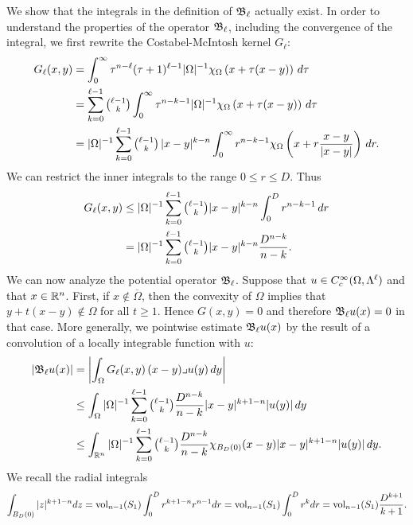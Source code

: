 \documentclass[a4paper]{article}
\begin{document}
We show that the integrals in the definition of ${\mathfrak B}_{\ell}$ actually exist. 
In order to understand the properties of the operator ${\mathfrak B}_{\ell}$,
including the convergence of the integral, we first rewrite the Costabel-McIntosh kernel $G_{\ell}$:
\begin{align*}
    G_{\ell}(x,y) 
    &= 
    \int_0^\infty \tau^{n-\ell} (\tau+1)^{\ell-1} |\Omega|^{-1} \chi_{\Omega} \left( x+\tau(x-y) \right)\,d\tau
    \\
    &= 
    \sum_{k=0}^{\ell-1}\tbinom{\ell-1}{k} 
    \int_0^\infty \tau^{n-k-1} |\Omega|^{-1} \chi_{\Omega}\left( x+\tau(x-y) \right)\,d\tau 
    \\
    &= 
    |\Omega|^{-1}\sum_{k=0}^{\ell-1}\tbinom{\ell-1}{k} \,
    |x-y|^{k-n} \int_0^\infty r^{n-k-1} \chi_{\Omega}\left(x+r\frac{x-y}{|x-y|}\right)\,dr
    .
\end{align*}
We can restrict the inner integrals to the range $0 \leq r \leq D$. Thus 
\begin{align*}
    G_{\ell}(x,y) 
    &\leq 
    |\Omega|^{-1} \sum_{k=0}^{\ell-1}\tbinom{\ell-1}{k} |x-y|^{k-n} \int_0^D r^{n-k-1} \,dr 
    \\
    &= 
    |\Omega|^{-1} \sum_{k=0}^{\ell-1}\tbinom{\ell-1}{k} |x-y|^{k-n} \frac{ D^{n-k} }{n-k}.
\end{align*}
We can now analyze the potential operator ${\mathfrak B}_{\ell}$. 
Suppose that $u \in C^{\infty}_{c}(\Omega,\Lambda^{\ell})$ and that $x \in {\mathbb R}^{n}$.
First, if $x \notin \overline\Omega$, then the convexity of $\Omega$ implies that $y + t( x - y ) \notin \Omega$ for all $t \geq 1$. Hence $G(x,y) = 0$ and therefore ${\mathfrak B}_{\ell} u(x) = 0$ in that case.
More generally, we pointwise estimate ${\mathfrak B}_{\ell} u(x)$ by the result of a convolution of a locally integrable function with $u$:
\begin{align*}
    \left| {\mathfrak B}_{\ell} u(x) \right|
    &=
    \left| 
        \int_{\Omega} G_{\ell}(x,y) \,(x-y)\lrcorner u(y)\,dy
    \right| 
    \\&\leq 
    \int_{\Omega} |\Omega|^{-1} \sum_{k=0}^{\ell-1}\tbinom{\ell-1}{k} \frac{ D^{n-k} }{n-k} |x-y|^{k+1-n} |u(y)| \,dy
    \\&\leq 
    \int_{{\mathbb R}^{n}} |\Omega|^{-1} \sum_{k=0}^{\ell-1}\tbinom{\ell-1}{k} \frac{ D^{n-k} }{n-k} \chi_{B_D(0)}(x-y) |x-y|^{k+1-n} |u(y)| \,dy
    .
\end{align*}
We recall the radial integrals 
\begin{align*}
    \int_{B_D(0)} |z|^{k+1-n} dz
    =
    \operatorname{vol}_{n-1}(S_1) \int_0^D r^{k+1-n} r^{n-1} dr
    =
    \operatorname{vol}_{n-1}(S_1) \int_0^D r^{k} dr
    =
    \operatorname{vol}_{n-1}(S_1) \frac{D^{k+1}}{k+1}
    .
\end{align*}
\end{document}
